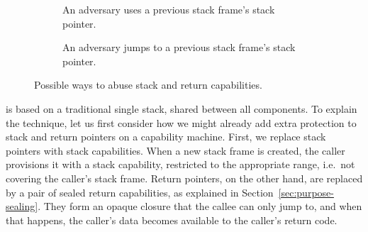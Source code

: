 \documentclass{jfp}
\begin{document}
\begin{figure}
\begin{subfigure}{0.45\linewidth}
    \caption{An adversary uses a previous stack frame's stack pointer.}
    \label{fig:stack-ptr-abuse}
  \end{subfigure}
  \begin{subfigure}{0.08\linewidth}
    \phantom{testtestes}
  \end{subfigure}
  \begin{subfigure}{0.45\linewidth}
    \centering
    \caption{An adversary jumps to a previous stack frame's stack pointer.}
    \label{fig:ret-ptr-abuse}
  \end{subfigure}
  
  \caption{Possible ways to abuse stack and return capabilities.}
  \label{fig:stack-ret-ptr-abuse}
\end{figure}

\stktokens{} is based on a traditional single stack, shared between all components.
To explain the technique, let us first consider how we might already add extra protection to stack and return pointers on a capability machine.
First, we replace stack pointers with stack capabilities.
When a new stack frame is created, the caller provisions it with a stack capability, restricted to the appropriate range, i.e.\ not covering the caller's stack frame.
Return pointers, on the other hand, are replaced by a pair of sealed return capabilities, as explained in Section~\ref{sec:purpose-sealing}.
They form an opaque closure that the callee can only jump to, and when that happens, the caller's data becomes available to the caller's return code. 
\end{document}
